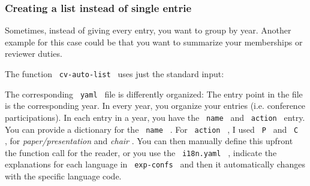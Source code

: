\subsubsection{Creating a list instead of single
entrie}\label{creating-a-list-instead-of-single-entrie}

Sometimes, instead of giving every entry, you want to group by year.
Another example for this case could be that you want to summarize your
memberships or reviewer duties.

The function \texttt{\ cv-auto-list\ } uses just the standard input:

\begin{Shaded}
\begin{Highlighting}[]

\end{Highlighting}
\end{Shaded}

The corresponding \texttt{\ yaml\ } file is differently organized: The
entry point in the file is the corresponding year. In every year, you
organize your entries (i.e. conference participations). In each entry in
a year, you have the \texttt{\ name\ } and \texttt{\ action\ } entry.
You can provide a dictionary for the \texttt{\ name\ } . For
\texttt{\ action\ } , I used \texttt{\ P\ } and \texttt{\ C\ } , for
\emph{paper/presentation} and \emph{chair} . You can then manually
define this upfront the function call for the reader, or you use the
\texttt{\ i18n.yaml\ } , indicate the explanations for each language in
\texttt{\ exp-confs\ } and then it automatically changes with the
specific language code.

\begin{Shaded}
\begin{Highlighting}[]
\KeywordTok{:}
\AttributeTok{  }\KeywordTok{:}
\AttributeTok{    }\KeywordTok{:}
\AttributeTok{    }\KeywordTok{:}
\AttributeTok{  }\KeywordTok{:}
\AttributeTok{    }\KeywordTok{:}
\AttributeTok{    }\KeywordTok{:}
\end{Highlighting}
\end{Shaded}

